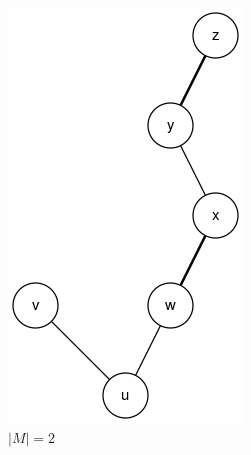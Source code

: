 \documentclass{article}      %
\begin{document}
\begin{figure}
	\centering
	\begin{subfigure}[b]{0.25\textwidth}
		\includegraphics[width=\textwidth]{img/graph.png}
		\caption{$|M|=2$}
		\label{fig:rw-aug-a}
	\end{subfigure}
	\qquad
	\begin{subfigure}[b]{0.25\textwidth}

\end{subfigure}
\end{figure}
\end{document}
